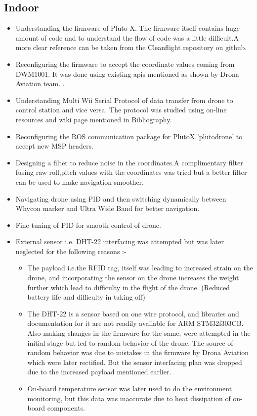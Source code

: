 \documentclass[a4paper,12pt,oneside]{book}
\begin{document}
\subsection{Indoor}
\begin{itemize}
\item Understanding the firmware of Pluto X. The firmware itself contains huge amount of code and to understand the flow of code was a little difficult.A more clear reference can be taken from the Cleanflight repository on github.
\item Reconfiguring the firmware to accept the coordinate values coming from DWM1001. It was done using existing apis mentioned as shown by Drona Aviation team. .
\item Understanding Multi Wii Serial Protocol of data transfer from drone to control station and vice versa. The protocol was studied using on-line resources and wiki page mentioned in Bibliography.
\item Reconfiguring the ROS communication package for PlutoX 'plutodrone' to accept new MSP headers.
\item Designing a filter to reduce noise in the coordinates.A complimentary filter fusing raw roll,pitch values with the coordinates was tried but a better filter can be used to make navigation smoother.
\item Navigating drone using PID and then switching dynamically between Whycon marker and Ultra Wide Band for better navigation.
\item Fine tuning of PID for smooth control of drone.
\item External sensor i.e. DHT-22 interfacing was attempted but was later neglected for the following reasons :-
\begin{itemize}
\item The payload i.e.the RFID tag, itself was leading to increased strain on the drone, and incorporating the sensor on the drone increases the weight further which lead to difficulty in the flight of the drone. (Reduced battery life and difficulty in taking off)
\item The DHT-22 is a sensor based on one wire protocol, and libraries and documentation for it are not readily available for ARM STM32f303CB. Also making changes in the firmware for the same, were attempted in the initial stage but led to random behavior of the drone. The source of random behavior was due to mistakes in the firmware by Drona Aviation which were later rectified. But the sensor interfacing plan was dropped due to the increased payload mentioned earlier.
\item On-board temperature sensor was later used to do the environment monitoring, but this data was inaccurate due to heat dissipation of on-board components. 
\end{itemize}
\end{itemize}
\end{document}
